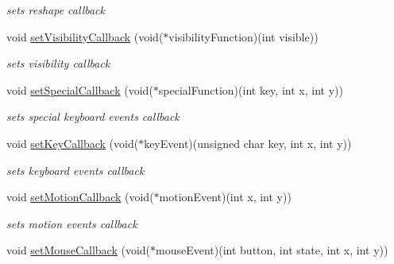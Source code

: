 \begin{DoxyCompactItemize}
\begin{DoxyCompactList}\small\item\em sets reshape callback \end{DoxyCompactList}\item 
\hypertarget{classavr_application_a8f3ad5c74ee7e337e87f6f78baf93141}{void \hyperlink{classavr_application_a8f3ad5c74ee7e337e87f6f78baf93141}{set\-Visibility\-Callback} (void($\ast$visibility\-Function)(int visible))}\label{classavr_application_a8f3ad5c74ee7e337e87f6f78baf93141}

\begin{DoxyCompactList}\small\item\em sets visibility callback \end{DoxyCompactList}\item 
\hypertarget{classavr_application_a9513e1755d955acc17cbbf5fcd331a07}{void \hyperlink{classavr_application_a9513e1755d955acc17cbbf5fcd331a07}{set\-Special\-Callback} (void($\ast$special\-Function)(int key, int x, int y))}\label{classavr_application_a9513e1755d955acc17cbbf5fcd331a07}

\begin{DoxyCompactList}\small\item\em sets special keyboard events callback \end{DoxyCompactList}\item 
\hypertarget{classavr_application_aa957ba4d970f15984767eeadb42ffafa}{void \hyperlink{classavr_application_aa957ba4d970f15984767eeadb42ffafa}{set\-Key\-Callback} (void($\ast$key\-Event)(unsigned char key, int x, int y))}\label{classavr_application_aa957ba4d970f15984767eeadb42ffafa}

\begin{DoxyCompactList}\small\item\em sets keyboard events callback \end{DoxyCompactList}\item 
\hypertarget{classavr_application_ac09ee787d3e0baafd373967a29c70f22}{void \hyperlink{classavr_application_ac09ee787d3e0baafd373967a29c70f22}{set\-Motion\-Callback} (void($\ast$motion\-Event)(int x, int y))}\label{classavr_application_ac09ee787d3e0baafd373967a29c70f22}

\begin{DoxyCompactList}\small\item\em sets motion events callback \end{DoxyCompactList}\item 
\hypertarget{classavr_application_af7c0e85b3ea4c60692698f25daa5980e}{void \hyperlink{classavr_application_af7c0e85b3ea4c60692698f25daa5980e}{set\-Mouse\-Callback} (void($\ast$mouse\-Event)(int button, int state, int x, int y))}\label{classavr_application_af7c0e85b3ea4c60692698f25daa5980e}


\end{DoxyCompactItemize}
